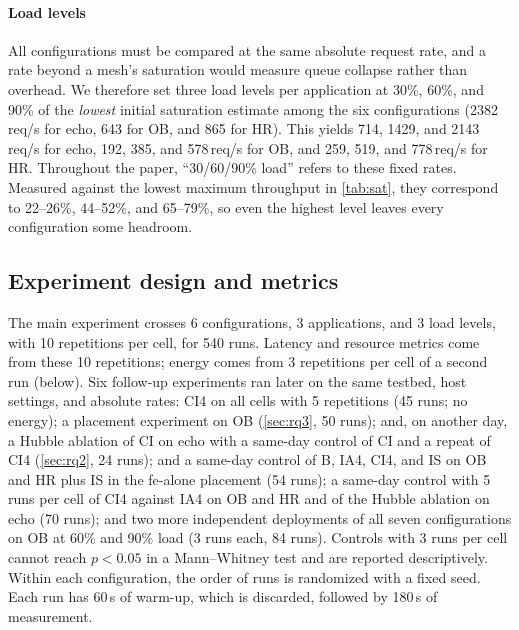 \paragraph{Load levels}
All configurations must be compared at the same absolute request rate, and a
rate beyond a mesh's saturation would measure queue collapse rather than
overhead. We therefore set three load levels per application at 30\%, 60\%,
and 90\% of the \emph{lowest} initial saturation estimate among the six
configurations (2382\,req/s for echo, 643 for OB, and 865 for HR). This yields
714, 1429, and 2143\,req/s for echo, 192, 385, and 578\,req/s for OB, and 259,
519, and 778\,req/s for HR. Throughout the paper, ``30/60/90\% load'' refers to
these fixed rates. Measured against the lowest maximum throughput in
\cref{tab:sat}, they correspond to 22--26\%, 44--52\%, and 65--79\%, so even
the highest level leaves every configuration some headroom.

\subsection{Experiment design and metrics}
\label{sec:design}

The main experiment crosses 6 configurations, 3 applications, and 3 load
levels, with 10 repetitions per cell, for 540 runs. Latency and resource
metrics come from these 10 repetitions; energy comes from 3 repetitions per
cell of a second run (below). Six follow-up experiments ran later on the same
testbed, host settings, and absolute rates: CI4 on all cells with 5
repetitions (45 runs; no energy); a placement experiment on OB (\cref{sec:rq3},
50 runs); and, on another day, a Hubble ablation of CI on echo with a
same-day control of CI and a repeat of CI4 (\cref{sec:rq2}, 24 runs); and a
same-day control of B, IA4, CI4, and IS on OB and HR plus IS in the fe-alone
placement (54 runs); a same-day control with 5 runs per cell of CI4 against
IA4 on OB and HR and of the Hubble ablation on echo (70 runs); and two more
independent deployments of all seven configurations on OB at 60\% and 90\%
load (3 runs each, 84 runs). Controls with 3 runs per cell cannot reach
$p<0.05$ in a Mann--Whitney test and are reported descriptively. Within each configuration,
the order of runs is randomized with a fixed seed. Each run has 60\,s of
warm-up, which is discarded, followed by 180\,s of measurement.

